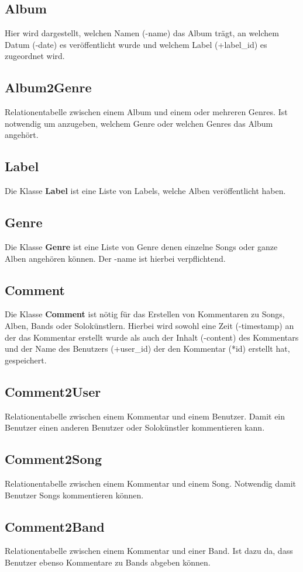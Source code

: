 \documentclass[11pt,a4paper,DIV=9]{scrartcl}
\begin{document}
  \subsection{Album}
    Hier wird dargestellt, welchen Namen (-name) das Album tr\"agt, an welchem Datum (-date) es ver\"offentlicht wurde und welchem Label (+label\_id) es zugeordnet wird.
  \subsection{Album2Genre}
    Relationentabelle zwischen einem Album und einem oder mehreren Genres. Ist notwendig um anzugeben, welchem Genre oder welchen Genres das Album angeh\"ort.
  \subsection{Label}
    Die Klasse \textbf{Label} ist eine Liste von Labels, welche Alben veröffentlicht haben.
  \subsection{Genre}
    Die Klasse \textbf{Genre} ist eine Liste von Genre denen einzelne Songs oder ganze Alben angehören können. Der -name ist hierbei verpflichtend.
  \subsection{Comment}
    Die Klasse \textbf{Comment} ist n\"otig f\"ur das Erstellen von Kommentaren zu Songs, Alben, Bands oder Solok\"unstlern. Hierbei wird sowohl eine Zeit (-timestamp) an der das Kommentar erstellt wurde als auch der Inhalt (-content) des Kommentars und der Name des Benutzers (+user\_id) der den Kommentar (*id) erstellt hat, gespeichert.
  \subsection{Comment2User}
    Relationentabelle zwischen einem Kommentar und einem Benutzer. Damit ein Benutzer einen anderen Benutzer oder Solok\"unstler kommentieren kann.
  \subsection{Comment2Song}
    Relationentabelle zwischen einem Kommentar und einem Song. Notwendig damit Benutzer Songs kommentieren k\"onnen.
  \subsection{Comment2Band}
    Relationentabelle zwischen einem Kommentar und einer Band. Ist dazu da, dass Benutzer ebenso Kommentare zu Bands abgeben k\"onnen.
\end{document}
